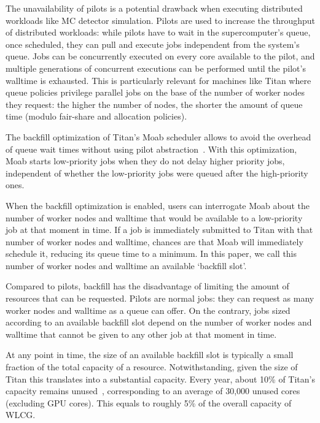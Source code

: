 The unavailability of pilots is a potential drawback when executing
distributed workloads like MC detector simulation. Pilots are used to
increase the throughput of distributed workloads: while pilots have to wait
in the supercomputer's queue, once scheduled, they can pull and execute jobs
independent from the system's queue. Jobs can be concurrently executed on
every core available to the pilot, and multiple generations of concurrent
executions can be performed until the pilot's walltime is exhausted. This is
particularly relevant for machines like Titan where queue policies privilege
parallel jobs on the base of the number of worker nodes they request: the
higher the number of nodes, the shorter the amount of queue time (modulo
fair-share and allocation policies).

The backfill optimization of Titan's Moab scheduler allows to avoid the
overhead of queue wait times without using pilot
abstraction~\cite{maui_backfill_url}. With this optimization, Moab starts
low-priority jobs when they do not delay higher priority jobs, independent of
whether the low-priority jobs were queued after the high-priority ones.

When the backfill optimization is enabled, users can interrogate Moab about
the number of worker nodes and walltime that would be available to a
low-priority job at that moment in time. If a job is immediately submitted to
Titan with that number of worker nodes and walltime, chances are that Moab
will immediately schedule it, reducing its queue time to a minimum. In this
paper, we call this number of worker nodes and walltime an available
`backfill slot'.

Compared to pilots, backfill has the disadvantage of limiting the amount of
resources that can be requested. Pilots are normal jobs: they can request as
many worker nodes and walltime as a queue can offer. On the contrary, jobs
sized according to an available backfill slot depend on the number of worker
nodes and walltime that cannot be given to any other job at that moment in
time.

At any point in time, the size of an available backfill slot is typically a
small fraction of the total capacity of a resource. Notwithstanding, given
the size of Titan this translates into a substantial capacity. Every year,
about 10\% of Titan's capacity remains unused~\cite{barker2016us},
corresponding to an average of 30,000 unused cores (excluding GPU cores).
This equals to roughly 5\% of the overall capacity of WLCG\@.

